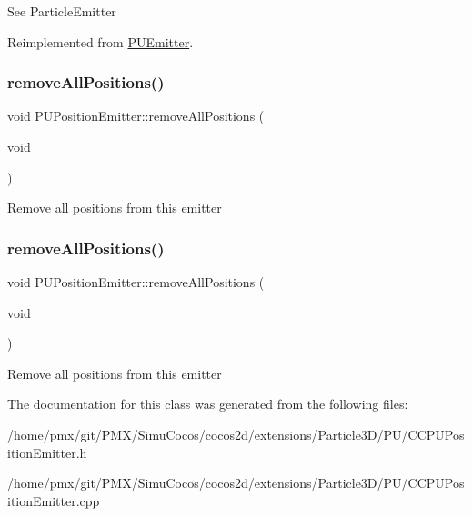 See Particle\+Emitter 

Reimplemented from \hyperlink{classPUEmitter}{P\+U\+Emitter}.

\mbox{\label{classPUPositionEmitter_a72b416af36fd90660a8d1778b559fefd}} 
\subsubsection{\texorpdfstring{remove\+All\+Positions()}{removeAllPositions()}\hspace{0.1cm}{\footnotesize\ttfamily [1/2]}}
{\footnotesize\ttfamily void P\+U\+Position\+Emitter\+::remove\+All\+Positions (\begin{DoxyParamCaption}\item[{void}]{ }\end{DoxyParamCaption})}

Remove all positions from this emitter \mbox{\label{classPUPositionEmitter_a72b416af36fd90660a8d1778b559fefd}} 
\subsubsection{\texorpdfstring{remove\+All\+Positions()}{removeAllPositions()}\hspace{0.1cm}{\footnotesize\ttfamily [2/2]}}
{\footnotesize\ttfamily void P\+U\+Position\+Emitter\+::remove\+All\+Positions (\begin{DoxyParamCaption}\item[{void}]{ }\end{DoxyParamCaption})}

Remove all positions from this emitter 

The documentation for this class was generated from the following files\+:\begin{DoxyCompactItemize}
\item 
/home/pmx/git/\+P\+M\+X/\+Simu\+Cocos/cocos2d/extensions/\+Particle3\+D/\+P\+U/C\+C\+P\+U\+Position\+Emitter.\+h\item 
/home/pmx/git/\+P\+M\+X/\+Simu\+Cocos/cocos2d/extensions/\+Particle3\+D/\+P\+U/C\+C\+P\+U\+Position\+Emitter.\+cpp\end{DoxyCompactItemize}
